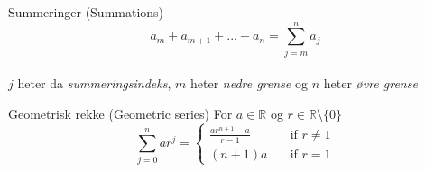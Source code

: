 \begin{frame}{Summeringer (Summations)}
    $$a_m + a_{m+1} + ... + a_n = \displaystyle\sum_{j=m}^{n} a_j$$\\
    $j$ heter da \textit{summeringsindeks}, $m$ heter \textit{nedre grense} og $n$ heter \textit{øvre grense}\\
    \pause
    \begin{block}{Geometrisk rekke (Geometric series)}
        For $a \in \mathbb{R}$ og $r \in \mathbb{R}\setminus\{0\}$
        $$\displaystyle\sum_{j=0}^{n} ar^j = \begin{cases}
            \frac{ar^{n+1} - a}{r - 1} & \quad \text{if } r \neq 1\\
            (n+1)a                     & \quad \text{if } r = 1
          \end{cases}$$
    \end{block}
\end{frame}

